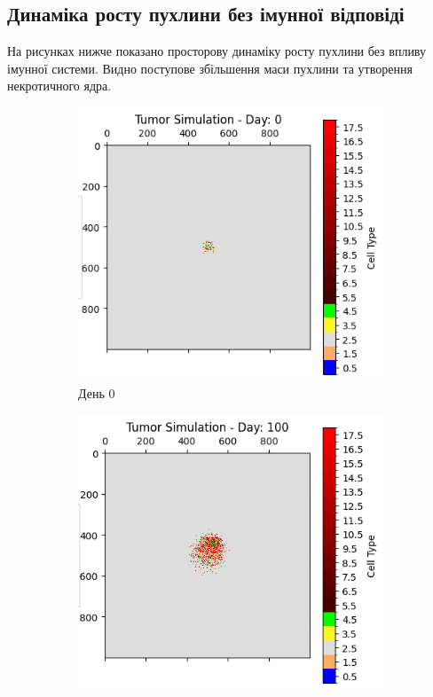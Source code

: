 \documentclass{article}
\begin{document}
\subsection{Динаміка росту пухлини без імунної відповіді}
На рисунках нижче показано просторову динаміку росту пухлини без впливу імунної системи. Видно поступове збільшення маси пухлини та утворення некротичного ядра.

\begin{figure}[H]
    \centering
    \begin{subfigure}[t]{0.32\linewidth}
        \centering
        \includegraphics[width=\linewidth]{tumor_simulation_stats/tumor_day_0.png}
        \caption{День 0}
        \label{fig:tumor-day-0-no-immune}
    \end{subfigure}
    \hfill
    \begin{subfigure}[t]{0.32\linewidth}
        \centering
        \includegraphics[width=\linewidth]{tumor_simulation_stats/tumor_day_100.png}

\end{subfigure}
\end{figure}
\end{document}
